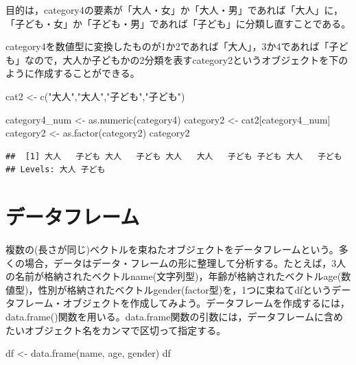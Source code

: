 \documentclass[
]{book}
\newenvironment{Shaded}{\begin{snugshade}}{\end{snugshade}}
\newcommand{\FunctionTok}[1]{\textcolor[rgb]{0.00,0.00,0.00}{#1}}
\newcommand{\NormalTok}[1]{#1}
\newcommand{\OtherTok}[1]{\textcolor[rgb]{0.56,0.35,0.01}{#1}}
\newcommand{\StringTok}[1]{\textcolor[rgb]{0.31,0.60,0.02}{#1}}
\begin{document}
目的は，category4の要素が「大人・女」か「大人・男」であれば「大人」に，「子ども・女」か「子ども・男」であれば「子ども」に分類し直すことである。

category4を数値型に変換したものが1か2であれば「大人」，3か4であれば「子ども」なので，大人か子どもかの2分類を表すcategory2というオブジェクトを下のように作成することができる。

\begin{Shaded}
\begin{Highlighting}[]
\NormalTok{cat2 }\OtherTok{\textless{}{-}} \FunctionTok{c}\NormalTok{(}\StringTok{"大人"}\NormalTok{,}\StringTok{"大人"}\NormalTok{,}\StringTok{"子ども"}\NormalTok{,}\StringTok{"子ども"}\NormalTok{)}

\NormalTok{category4\_num }\OtherTok{\textless{}{-}} \FunctionTok{as.numeric}\NormalTok{(category4)}
\NormalTok{category2 }\OtherTok{\textless{}{-}}\NormalTok{ cat2[category4\_num]}
\NormalTok{category2 }\OtherTok{\textless{}{-}} \FunctionTok{as.factor}\NormalTok{(category2)}
\NormalTok{category2}
\end{Highlighting}
\end{Shaded}

\begin{verbatim}
##  [1] 大人   子ども 大人   子ども 大人   大人   子ども 子ども 大人   子ども
## Levels: 大人 子ども
\end{verbatim}

\hypertarget{ux30c7ux30fcux30bfux30d5ux30ecux30fcux30e0}{%
\section{データフレーム}\label{ux30c7ux30fcux30bfux30d5ux30ecux30fcux30e0}}

複数の(長さが同じ)ベクトルを束ねたオブジェクトをデータフレームという。多くの場合，データはデータ・フレームの形に整理して分析する。たとえば，3人の名前が格納されたベクトルname(文字列型)，年齢が格納されたベクトルage(数値型)，性別が格納されたベクトルgender(factor型)を，1つに束ねてdfというデータフレーム・オブジェクトを作成してみよう。データフレームを作成するには，data.frame()関数を用いる。data.frame関数の引数には，データフレームに含めたいオブジェクト名をカンマで区切って指定する。

\begin{Shaded}
\begin{Highlighting}[]
\NormalTok{df }\OtherTok{\textless{}{-}} \FunctionTok{data.frame}\NormalTok{(name, age, gender)}
\NormalTok{df}
\end{Highlighting}
\end{Shaded}
\end{document}
